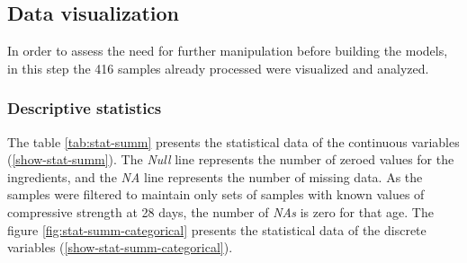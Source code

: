\documentclass[]{article}
\begin{document}
\hypertarget{data-visualization}{%
\subsection{Data visualization}\label{data-visualization}}

In order to assess the need for further manipulation before building the
models, in this step the 416 samples already processed were visualized
and analyzed.

\hypertarget{descriptive-statistics}{%
\subsubsection{Descriptive statistics}\label{descriptive-statistics}}

The table \ref{tab:stat-summ} presents the statistical data of the
continuous variables (\ref {show-stat-summ}). The \emph{Null} line
represents the number of zeroed values for the ingredients, and the
\emph{NA} line represents the number of missing data. As the samples
were filtered to maintain only sets of samples with known values of
compressive strength at 28 days, the number of \emph{NAs} is zero for
that age. The figure \ref{fig:stat-summ-categorical} presents the
statistical data of the discrete variables
(\ref{show-stat-summ-categorical}).

~
\end{document}
